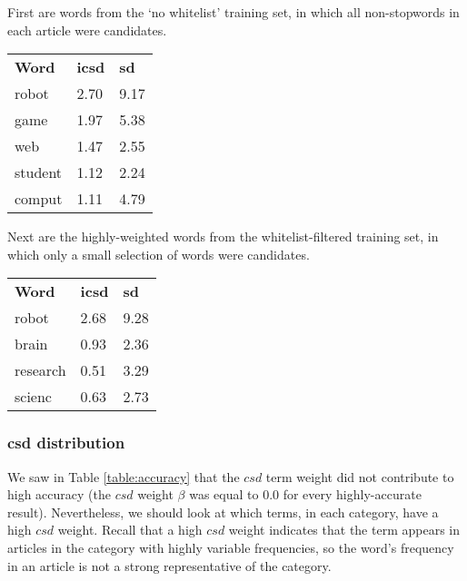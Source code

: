 \documentclass{article}
\begin{document}
First are words from the `no whitelist' training set, in which all
non-stopwords in each article were candidates.

\begin{center}
  \begin{tabular}{lll}
    {\textbf{Word}} & {\textbf{icsd}} & {\textbf{sd}}\\
    robot & 2.70 & 9.17\\
    game & 1.97 & 5.38\\
    web & 1.47 & 2.55\\
    student & 1.12 & 2.24\\
    comput & 1.11 & 4.79\\
  \end{tabular}
\end{center}

Next are the highly-weighted words from the whitelist-filtered training set, in
which only a small selection of words were candidates.

\begin{center}
  \begin{tabular}{lll}
    {\textbf{Word}} & {\textbf{icsd}} & {\textbf{sd}}\\
    robot & 2.68 & 9.28\\
    brain & 0.93 & 2.36\\
    research & 0.51 & 3.29\\
    scienc & 0.63 & 2.73
  \end{tabular}
\end{center}

\subsubsection{csd distribution}

We saw in Table \ref{table:accuracy} that the $csd$ term weight did not
contribute to high accuracy (the $csd$ weight $\beta$ was equal to 0.0 for
every highly-accurate result). Nevertheless, we should look at which terms, in
each category, have a high $csd$ weight. Recall that a high $csd$ weight
indicates that the term appears in articles in the category with highly
variable frequencies, so the word's frequency in an article is not a strong
representative of the category.
\end{document}
